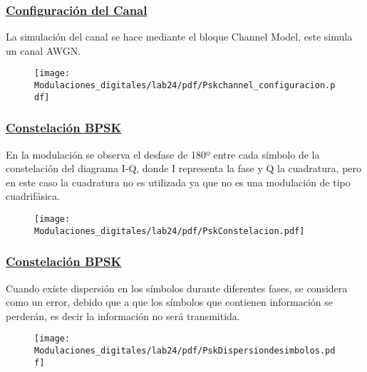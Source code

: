  \begin{frame}
   
  \frametitle{\underline{\textbf{Configuración del Canal}}}
 
   \begin{flushleft}
    La simulación del canal se hace mediante el bloque Channel Model, este simula un canal AWGN.
   \end{flushleft}
   \begin{figure}[H]
   \centering
   \vspace{-3mm}
   \texttt{[image: Modulaciones\_digitales/lab24/pdf/Pskchannel\_configuracion.pdf]} 
   \end{figure} 
 \end{frame} 

 \begin{frame}
   
  \frametitle{\underline{\textbf{Constelación BPSK}}}
   \begin{flushleft}
   En la modulación se observa el desfase de 180º entre cada símbolo de la constelación del diagrama I-Q, donde I representa la fase y Q la cuadratura, pero en este caso la cuadratura no es utilizada ya que no es una modulación de tipo cuadrifásica.
   \end{flushleft}
   \begin{figure}[H]
   \centering
   \vspace{-3mm}
   \texttt{[image: Modulaciones\_digitales/lab24/pdf/PskConstelacion.pdf]}
   \end{figure}
 \end{frame}

 \begin{frame}
   
  \frametitle{\underline{\textbf{Constelación BPSK}}}
 
    \begin{flushleft}
    Cuando exíste dispersión en los símbolos durante diferentes fases, se considera como un     error, debido que a que los símbolos que contienen información se perderán, es decir la información no será transmitida.
    \end{flushleft}
    \begin{figure}[H]
    \centering
    \vspace{-3mm}
    \texttt{[image: Modulaciones\_digitales/lab24/pdf/PskDispersiondesimbolos.pdf]}
    \end{figure}
 \end{frame}

